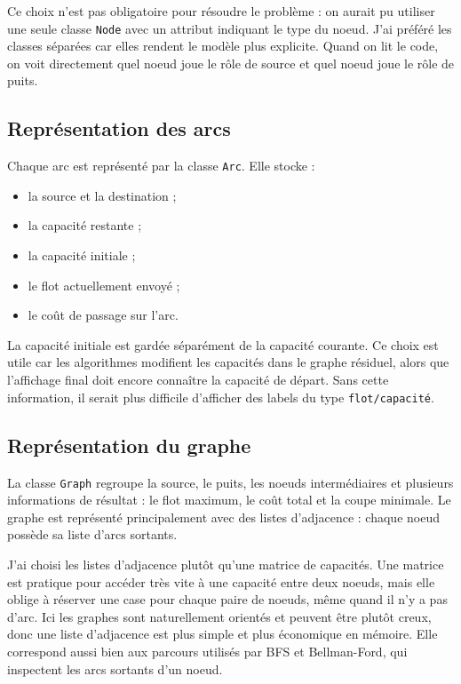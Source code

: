 \documentclass[11pt,a4paper]{article}
\begin{document}
Ce choix n'est pas obligatoire pour résoudre le problème : on aurait pu utiliser
une seule classe \texttt{Node} avec un attribut indiquant le type du noeud. J'ai
préféré les classes séparées car elles rendent le modèle plus explicite. Quand
on lit le code, on voit directement quel noeud joue le rôle de source et quel
noeud joue le rôle de puits.

\subsection{Représentation des arcs}

Chaque arc est représenté par la classe \texttt{Arc}. Elle stocke :
\begin{itemize}
    \item la source et la destination ;
    \item la capacité restante ;
    \item la capacité initiale ;
    \item le flot actuellement envoyé ;
    \item le coût de passage sur l'arc.
\end{itemize}

La capacité initiale est gardée séparément de la capacité courante. Ce choix est
utile car les algorithmes modifient les capacités dans le graphe résiduel, alors
que l'affichage final doit encore connaître la capacité de départ. Sans cette
information, il serait plus difficile d'afficher des labels du type
\texttt{flot/capacité}.

\subsection{Représentation du graphe}

La classe \texttt{Graph} regroupe la source, le puits, les noeuds intermédiaires
et plusieurs informations de résultat : le flot maximum, le coût total et la
coupe minimale. Le graphe est représenté principalement avec des listes
d'adjacence : chaque noeud possède sa liste d'arcs sortants.

J'ai choisi les listes d'adjacence plutôt qu'une matrice de capacités. Une
matrice est pratique pour accéder très vite à une capacité entre deux noeuds,
mais elle oblige à réserver une case pour chaque paire de noeuds, même quand il
n'y a pas d'arc. Ici les graphes sont naturellement orientés et peuvent être
plutôt creux, donc une liste d'adjacence est plus simple et plus économique en
mémoire. Elle correspond aussi bien aux parcours utilisés par BFS et
Bellman-Ford, qui inspectent les arcs sortants d'un noeud.
\end{document}
